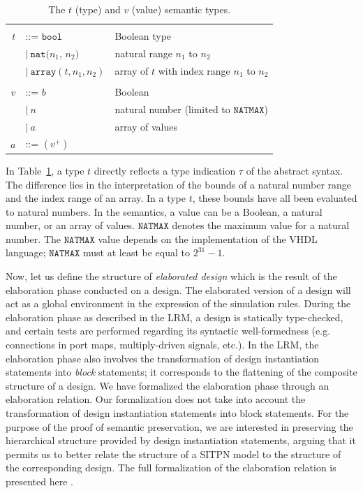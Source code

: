\documentclass[pdflatex,sn-mathphys]{sn-jnl}%
\theoremstyle{thmstyleone}%
\theoremstyle{thmstyletwo}%
\theoremstyle{thmstylethree}%
\begin{document}
\begin{table}[!htbp]
  \caption{The $t$ (type) and $v$ (value) semantic types.}
  \label{tab:type-value}

  \begin{tabular}{|rll|}
    \hline
    && \\
    $t$ & ::= $\mathtt{bool}$ & Boolean type \\
    & \quad $\vert~\mathtt{nat}(n_1$, $n_2)$ & natural range $n_1$ to $n_2$ \\
    & \quad $\vert~\mathtt{array}(t, n_1, n_2)$ & array of $t$ with index range $n_1$ to $n_2$ \\
    & & \\
    $v$ & ::= $b$ & Boolean \\
    & \quad $\vert~{}n$ & natural number (limited to $\mathtt{NATMAX}$) \\
    & \quad $\vert~a$ & array of values \\
    $a$ & ::= $(v^{+})$ & \\
    \hline
  \end{tabular}    
\end{table}

In Table~\ref{tab:type-value}, a type $t$ directly reflects a type
indication $\tau$ of the abstract syntax. The difference lies in the
interpretation of the bounds of a natural number range and the index
range of an array. In a type $t$, these bounds have all been evaluated
to natural numbers. In the \hvhdl{} semantics, a value can be a
Boolean, a natural number, or an array of values. $\mathtt{NATMAX}$
denotes the maximum value for a natural number.  The $\mathtt{NATMAX}$
value depends on the implementation of the \textsf{VHDL} language;
$\mathtt{NATMAX}$ must at least be equal to $2^{31}-1$.

Now, let us define the structure of \textit{elaborated design} which
is the result of the elaboration phase conducted on a \hvhdl{}
design. The elaborated version of a design will act as a global
environment in the expression of the simulation rules. During the
elaboration phase as described in the LRM, a design is statically
type-checked, and certain tests are performed regarding its syntactic
well-formedness (e.g. connections in port maps, multiply-driven
signals, etc.). In the LRM, the elaboration phase also involves the
transformation of design instantiation statements into \textit{block}
statements; it corresponds to the flattening of the composite
structure of a design.  We have formalized the elaboration phase
through an elaboration relation. Our formalization does not take into
account the transformation of design instantiation statements into
block statements. For the purpose of the proof of semantic
preservation, we are interested in preserving the hierarchical
structure provided by design instantiation statements, arguing that it
permits us to better relate the structure of a SITPN model to the
structure of the corresponding \hvhdl{} design. The full formalization
of the elaboration relation is presented here
\cite{Iampietro2022HVHDL}.
\end{document}
